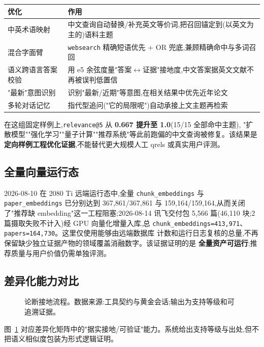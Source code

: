 \begin{tableblock}
\begin{tabularx}{0.94\textwidth}{lX}
\toprule
\textbf{优化} & \textbf{作用} \\
\midrule
中英术语映射 & 中文查询自动替换/补充英文等价词,把召回锚定到(以英文为主的)语料主题 \\
混合字面臂 & \texttt{websearch} 精确短语优先 + OR 兜底,兼顾精确命中与多词召回 \\
语义跨语言答案校验 & 用 e5 余弦度量"答案$\leftrightarrow$证据"接地度,中文答案据英文文献不再被误判低置信 \\
"最新"意图识别 & 识别"最新/近期"等意图,在相关结果中优先近年论文 \\
多轮对话记忆 & 指代型追问("它的局限呢")自动承接上文主题再检索 \\
\bottomrule
\end{tabularx}
\end{tableblock}

在这组固定样例上,\texttt{relevance@5} 从 \textbf{0.667 提升至 1.0}(15/15 全部命中主题),
"扩散模型""强化学习""量子计算""推荐系统"等此前跑偏的中文查询被修复。该结果是\textbf{定向样例工程优化证据},不能替代更大规模人工 qrels 或真实用户评测。

\subsection{全量向量运行态}
2026-08-10 在 2080 Ti 远端运行态中,全量 \texttt{chunk\_embeddings} 与
\texttt{paper\_embeddings} 已分别达到 367{,}861/367{,}861 与
159{,}164/159{,}164,从而关闭了"推荐缺 embedding"这一工程阻塞;2026-08-14 讯飞交付包 5{,}566 篇(46{,}110 块;2 篇摄取失败不计入)经 GPU 向量化增量入库,总 \texttt{chunk\_embeddings=413{,}971}、\texttt{papers=164{,}730}。这里仅使用能够由远端数据库
计数和运行日志复核的总量,不再保留缺少独立证据产物的领域覆盖消融数字。该证据证明的是
\textbf{全量资产可运行};推荐质量与用户价值仍需单独评测。

\subsection{差异化能力对比}
\begin{figure}[!htbp]
\centering
{}
\caption{论断接地流程。数据来源:工具契约与黄金会话;输出为支持等级和可追溯证据。}
\label{fig:claim-grounding-flow}
\end{figure}

图~\ref{fig:claim-grounding-flow} 对应差异化矩阵中的"据实接地/可验证"能力。系统给出支持等级与出处,但不把语义相似度包装为形式逻辑证明。

